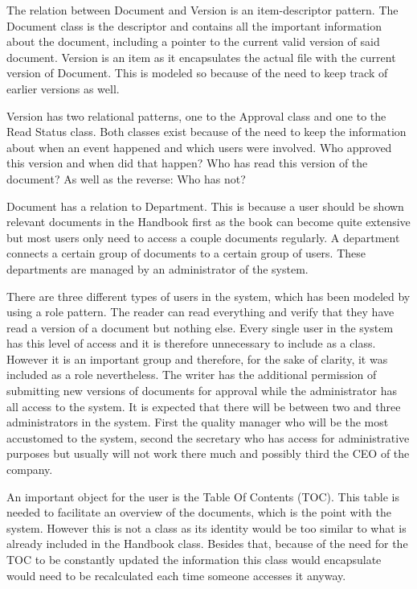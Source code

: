 The relation between Document and Version is an item-descriptor pattern. The Document class is the descriptor and contains all the important information about the document, including a pointer to the current valid version of said document. Version is an item as it encapsulates the actual file with the current version of Document. This is modeled so because of the need to keep track of earlier versions as well.

Version has two relational patterns, one to the Approval class and one to the Read Status class. Both classes exist because of the need to keep the information about when an event happened and which users were involved. Who approved this version and when did that happen? Who has read this version of the document? As well as the reverse: Who has not?

Document has a relation to Department. This is because a user should be shown relevant documents in the Handbook first as the book can become quite extensive but most users only need to access a couple documents regularly. A department connects a certain group of documents to a certain group of users. These departments are managed by an administrator of the system.

There are three different types of users in the system, which has been modeled by using a role pattern. The reader can read everything and verify that they have read a version of a document but nothing else. Every single user in the system has this level of access and it is therefore unnecessary to include as a class. However it is an important group and therefore, for the sake of clarity, it was included as a role nevertheless. The writer has the additional permission of submitting new versions of documents for approval while the administrator has all access to the system. It is expected that there will be between two and three administrators in the system. First the quality manager who will be the most accustomed to the system, second the secretary who has access for administrative purposes but usually will not work there much and possibly third the CEO of the company.

An important object for the user is the Table Of Contents (TOC). This table is needed to facilitate an overview of the documents, which is the point with the system. However this is not a class as its identity would be too similar to what is already included in the Handbook class. Besides that, because of the need for the TOC to be constantly updated the information this class would encapsulate would need to be recalculated each time someone accesses it anyway.

